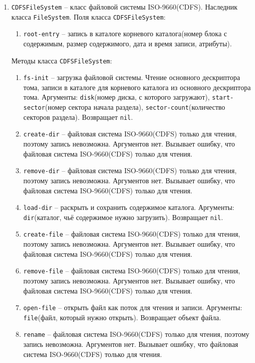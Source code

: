 \begin{enumerate}
\item \texttt{CDFSFileSystem} -- класс файловой системы ISO-9660(CDFS). Наследник класса \texttt{FileSystem}. Поля класса \texttt{CDFSFileSystem}:

	\begin{enumerate}
	\item \texttt{root-entry} -- запись в каталоге корневого каталога(номер блока с содержимым, размер содержимого, дата и время записи, атрибуты).
	\end{enumerate}
	
Методы класса \texttt{CDFSFileSystem}:

\begin{enumerate}
	\item \texttt{fs-init} -- загрузка файловой системы. Чтение основного дескриптора тома, записи в каталоге для корневого каталога из основного дескриптора тома. Аргументы: \texttt{disk}(номер диска, с которого загружают), \texttt{start-sector}(номер сектора начала раздела), \texttt{sector-count}(количество секторов раздела). Возвращает \texttt{nil}.
	\item \texttt{create-dir} -- файловая система ISO-9660(CDFS) только для чтения, поэтому запись невозможна. Аргументов нет. Вызывает ошибку, что файловая система ISO-9660(CDFS) только для чтения.
	\item \texttt{remove-dir} -- файловая система ISO-9660(CDFS) только для чтения, поэтому запись невозможна. Аргументов нет. Вызывает ошибку, что файловая система ISO-9660(CDFS) только для чтения.
	\item \texttt{load-dir} -- раскрыть и сохранить содержимое каталога. Аргументы: \texttt{dir}(каталог, чьё содержимое нужно загрузить). Возвращает \texttt{nil}.
	\item \texttt{create-file} -- файловая система ISO-9660(CDFS) только для чтения, поэтому запись невозможна. Аргументов нет. Вызывает ошибку, что файловая система ISO-9660(CDFS) только для чтения.
	\item \texttt{remove-file} -- файловая система ISO-9660(CDFS) только для чтения, поэтому запись невозможна. Аргументов нет. Вызывает ошибку, что файловая система ISO-9660(CDFS) только для чтения.
	\item \texttt{open-file} -- открыть файл как поток для чтения и записи. Аргументы: \texttt{file}(файл, который нужно открыть). Возвращает объект файла.
	\item \texttt{rename} -- файловая система ISO-9660(CDFS) только для чтения, поэтому запись невозможна. Аргументов нет. Вызывает ошибку, что файловая система ISO-9660(CDFS) только для чтения.

\end{enumerate}
\end{enumerate}
